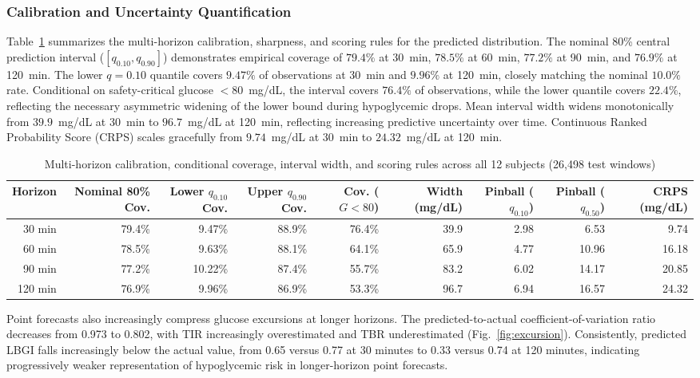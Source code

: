 \documentclass[journal]{IEEEtran}
\begin{document}
\subsubsection{Calibration and Uncertainty Quantification}
Table~\ref{tab:calibration} summarizes the multi-horizon calibration, sharpness, and scoring rules for the predicted distribution. The nominal 80\% central prediction interval ($[q_{0.10}, q_{0.90}]$) demonstrates empirical coverage of $79.4\%$ at 30~min, $78.5\%$ at 60~min, $77.2\%$ at 90~min, and $76.9\%$ at 120~min. The lower $q=0.10$ quantile covers $9.47\%$ of observations at 30~min and $9.96\%$ at 120~min, closely matching the nominal $10.0\%$ rate. Conditional on safety-critical glucose $< 80$~mg/dL, the interval covers $76.4\%$ of observations, while the lower quantile covers $22.4\%$, reflecting the necessary asymmetric widening of the lower bound during hypoglycemic drops. Mean interval width widens monotonically from $39.9$~mg/dL at 30~min to $96.7$~mg/dL at 120~min, reflecting increasing predictive uncertainty over time. Continuous Ranked Probability Score (CRPS) scales gracefully from $9.74$~mg/dL at 30~min to $24.32$~mg/dL at 120~min.

\begin{table}[t]
\centering
\caption{Multi-horizon calibration, conditional coverage, interval width, and scoring rules across all 12 subjects (26,498 test windows)}
\label{tab:calibration}
\footnotesize
\begin{tabular}{rrrrrrrrr}
\toprule
Horizon & Nominal 80\% Cov. & Lower $q_{0.10}$ Cov. & Upper $q_{0.90}$ Cov. & Cov. ($G<80$) & Width (mg/dL) & Pinball ($q_{0.10}$) & Pinball ($q_{0.50}$) & CRPS (mg/dL) \\
\midrule
30 min  & 79.4\% & 9.47\%  & 88.9\% & 76.4\% & 39.9 & 2.98 & 6.53  & 9.74 \\
60 min  & 78.5\% & 9.63\%  & 88.1\% & 64.1\% & 65.9 & 4.77 & 10.96 & 16.18 \\
90 min  & 77.2\% & 10.22\% & 87.4\% & 55.7\% & 83.2 & 6.02 & 14.17 & 20.85 \\
120 min & 76.9\% & 9.96\%  & 86.9\% & 53.3\% & 96.7 & 6.94 & 16.57 & 24.32 \\
\bottomrule
\end{tabular}
\end{table}



Point forecasts also increasingly compress glucose excursions at longer horizons. The predicted-to-actual coefficient-of-variation ratio decreases from 0.973 to 0.802, with TIR increasingly overestimated and TBR underestimated (Fig.~\ref{fig:excursion}). Consistently, predicted LBGI falls increasingly below the actual value, from 0.65 versus 0.77 at 30 minutes to 0.33 versus 0.74 at 120 minutes, indicating progressively weaker representation of hypoglycemic risk in longer-horizon point forecasts.
\end{document}
